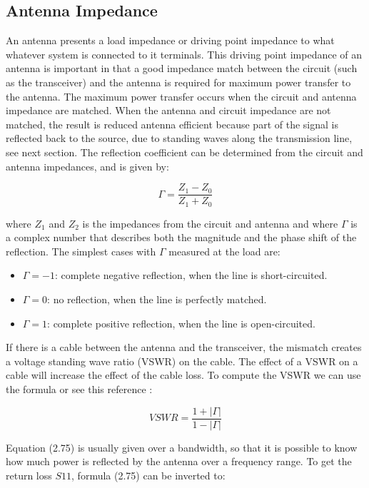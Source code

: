 \subsection{Antenna Impedance}
An antenna presents a load impedance or driving point impedance to what whatever system is connected to it terminals. This driving point impedance of an antenna is important in that a good impedance match between the circuit (such as the transceiver) and the antenna is required for maximum power transfer to the antenna. The maximum power transfer occurs when the circuit and antenna impedance are matched. When the antenna and circuit impedance are not matched, the result is reduced antenna efficient because part of the signal is reflected back to the source, due to standing waves along the transmission line, see next section. The reflection coefficient can be determined from the circuit and antenna impedances, and is given by: 

\begin{equation}
   \Gamma = \frac{Z_1-Z_0}{Z_1+Z_0}
\end{equation}

where $Z_1$ and $Z_2$ is the impedances from the circuit and antenna and where $\Gamma$ is a complex number that describes both the magnitude and the phase shift of the reflection. The simplest cases with $\Gamma$ measured at the load are: 

\begin{itemize}
  \item $\Gamma = -1$: complete negative reflection, when the line is short-circuited.
  \item $\Gamma = 0$: no reflection, when the line is perfectly matched.
   \item $\Gamma = 1$: complete positive reflection, when the line is open-circuited.
\end{itemize}

If there is a cable between the antenna and the transceiver, the mismatch creates a voltage standing wave ratio (VSWR) on the cable. The effect of a VSWR on a cable will increase the effect of the cable loss. To compute the VSWR we can use the formula or see this reference \cite{AntennaThoryVSWRCalculator}:

\begin{equation}
   VSWR= \frac{1+|\Gamma|}{1-|\Gamma|}
\end{equation}

Equation (2.75)  is usually given over a bandwidth, so that it is possible to know how much power is reflected by the antenna over a frequency range. To get the return loss $S11$, formula (2.75) can be inverted to: 

